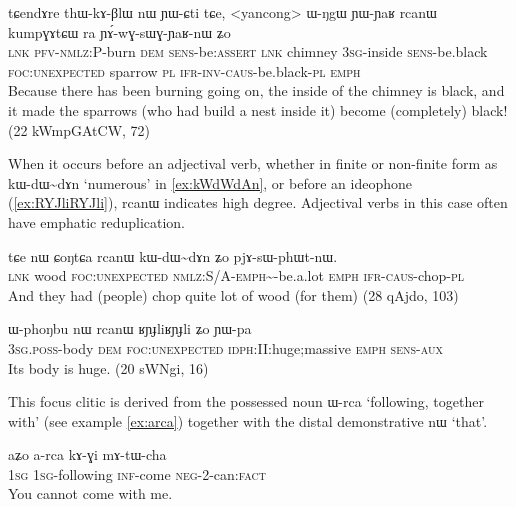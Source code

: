 \documentclass[oldfontcommands,oneside,a4paper,11pt]{article}
\newcommand{\ipa}[1]{\mbox{\phon #1}} %
\begin{document}
\begin{exe}
\ex \label{ex:YAwGsWGYaRnW}
\gll 
\ipa{tɕendɤre} 	\ipa{thɯ-kɤ-βlɯ} 	\ipa{nɯ} 	\ipa{ɲɯ-ɕti} 	\ipa{tɕe,} 	<yancong>	 \ipa{ɯ-ŋgɯ} 	\ipa{ɲɯ-ɲaʁ} 	\ipa{rcanɯ} 	\ipa{kumpɣɤtɕɯ} 	\ipa{ra} 	\ipa{ɲɤ́-wɣ-sɯɣ-ɲaʁ-nɯ} 	\ipa{ʑo} 	\\
\textsc{lnk} \textsc{pfv-nmlz}:P-burn \textsc{dem} \textsc{sens}-be:\textsc{assert} \textsc{lnk} chimney \textsc{3sg}-inside \textsc{sens}-be.black \textsc{foc:unexpected} sparrow \textsc{pl} \textsc{ifr-inv-caus}-be.black-\textsc{pl} \textsc{emph} \\
\glt Because there has been burning going on, the inside of the chimney is black, and it made the sparrows (who had build a nest inside it) become (completely) black! (22 kWmpGAtCW, 72)
\end{exe}
When it occurs before an adjectival verb, whether in finite or non-finite form as \ipa{kɯ-dɯ\textasciitilde{}dɤn} `numerous' in \ref{ex:kWdWdAn}, or before an ideophone (\ref{ex:RYJliRYJli}), \ipa{rcanɯ} indicates high degree. Adjectival verbs in this case often have emphatic reduplication.

\begin{exe}
\ex \label{ex:kWdWdAn}
\gll \ipa{tɕe} 	\ipa{nɯ} 	\ipa{ɕoŋtɕa} 	\ipa{rcanɯ} 	\ipa{kɯ-dɯ\textasciitilde{}dɤn} 	\ipa{ʑo} 	\ipa{pjɤ-sɯ-phɯt-nɯ.} \\
\textsc{lnk} wood \textsc{foc:unexpected} \textsc{nmlz}:S/A-\textsc{emph}\textasciitilde{}-be.a.lot \textsc{emph} \textsc{ifr-caus}-chop-\textsc{pl}\\
\glt And they had (people) chop quite lot of wood (for them) (28 qAjdo,  103)
\end{exe}

\begin{exe}
\ex \label{ex:RYJliRYJli}
\gll
\ipa{ɯ-phoŋbu} 	\ipa{nɯ} 	\ipa{rcanɯ} 	\ipa{ʁɲɟliʁɲɟli} 	\ipa{ʑo} 	\ipa{ɲɯ-pa} \\
\textsc{3sg.poss}-body \textsc{dem}  \textsc{foc:unexpected} \textsc{idph}:II:huge;massive \textsc{emph} \textsc{sens}-\textsc{aux} \\
\glt Its body is huge. (20 sWNgi,  16)
\end{exe}

This focus clitic is derived from the possessed noun  \ipa{ɯ-rca} `following, together with' (see example \ref{ex:arca}) together with the distal demonstrative \ipa{nɯ} `that'.

\begin{exe}
\ex \label{ex:arca}
\gll
\ipa{aʑo} 	\ipa{a-rca} 	\ipa{kɤ-ɣi} 	\ipa{mɤ-tɯ-cha} \\
\textsc{1sg} \textsc{1sg}-following \textsc{inf}-come \textsc{neg}-2-can:\textsc{fact} \\
\glt You cannot come with me.
\end{exe}
 
\end{document}
